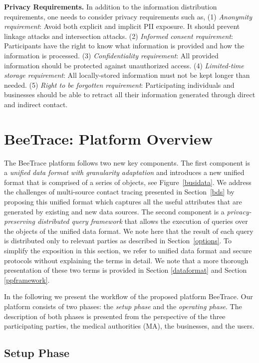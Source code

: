 \documentclass[11pt,dvipdfmx]{article}  %
\newcommand{\sysname}{\textsf{BeeTrace}\xspace}
\begin{document}
\textbf{Privacy Requirements. }In addition to the information distribution requirements, one needs to consider privacy requirements such as, (1) \emph{Anonymity requirement}: Avoid both explicit and implicit PII exposure. It should prevent linkage attacks and intersection attacks. 
(2) \emph{Informed consent requirement}: Participants have the right to know what information is provided and how the information is processed. (3) \emph{Confidentiality requirement}: All provided information should be protected against unauthorized access. 
(4) \emph{Limited-time storage requirement}: All locally-stored information must not be kept longer than needed. (5) \emph{Right to be forgotten requirement}: Participating individuals and businesses should be able to retract all their information generated through direct and indirect contact.


\section{\sysname: Platform Overview}
\label{poverview}

The \sysname platform follows two new key components. 
The first component is a \emph{unified data format with granularity adaptation} and introduces a new unified format that is comprised of a series of objects, see Figure~\ref{busidata}.
We address the challenges of multi-source contact tracing presented in Section~\ref{bds} by proposing this unified format which captures all the useful attributes that are generated by existing and new data sources. 
The second component is a \emph{privacy-preserving distributed query framework} that allows the execution of queries over the objects of the unified data format. 
We note here that the result of each query is distributed only to relevant parties as described in Section~\ref{options}. 
To simplify the exposition in this section, we refer to unified data format and secure protocols without explaining the terms in detail. 
We note that a more thorough presentation of these two terms is provided in Section \ref{dataformat} and Section \ref{ppframework}.

In the following we present the workflow of the proposed platform \sysname. 
Our platform consists of two phases: the \emph{setup phase} and the \emph{operating phase}. 
The description of both phases is presented from the perspective of the three participating parties, the medical authorities (MA), the businesses, and the users. 


\subsection{Setup Phase}
\end{document}
